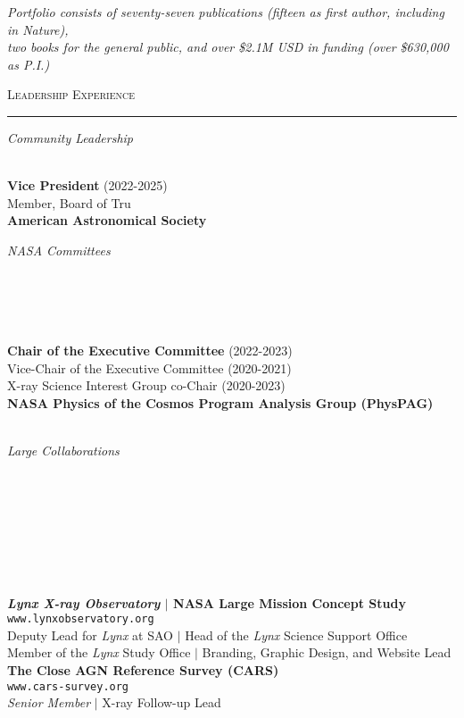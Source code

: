 \documentclass[11pt]{article}
\makeatletter
\def\vhrulefill#1{\leavevmode\leaders\hrule\@height#1\hfill \kern\z@}
\makeatother
\begin{document}
\begin{center}
\textit{Portfolio consists of seventy-seven publications (fifteen as first author, including in Nature), \\ two books for the general public, and over \$2.1M USD in funding (over \$630,000 as P.I.) }  \\
\end{center}


\clearpage




\textsc{Leadership Experience} \vhrulefill{0.4pt}


\vspace{6mm}


\hspace{2.5mm} \parbox{1.5in}{\textit{Community Leadership}\\\\} \parbox{5.15in}{\textbf{Vice President} (2022-2025) \\ Member, Board of Tru\\ \textbf{American Astronomical Society}\\
}

\hspace{2.5mm} \parbox{1.5in}{\textit{NASA Committees}\\\\\\\\\\} \parbox{5.15in}{\textbf{Chair of the Executive Committee} (2022-2023) \\ Vice-Chair of the Executive Committee (2020-2021) \\ X-ray Science Interest Group co-Chair (2020-2023) \\ \textbf{NASA Physics of the Cosmos Program Analysis Group (PhysPAG)}\\\\
}


\hspace{2.5mm} \parbox{1.5in}{\textit{Large Collaborations \\\\\\\\\\\\\\\\}} \parbox{5.15in}{\textbf{\textit{Lynx X-ray Observatory} $|$ NASA Large Mission Concept Study} \\
\texttt{www.lynxobservatory.org} \\ Deputy Lead for \textit{Lynx} at SAO $|$ Head of the \textit{Lynx} Science Support Office \\ Member of the \textit{Lynx} Study Office $|$ Branding, Graphic Design, and Website Lead \\




\textbf{The Close AGN Reference Survey (CARS)} \\ \texttt{www.cars-survey.org} \\ \textit{Senior Member} $|$ X-ray Follow-up Lead \\
}
\end{document}
